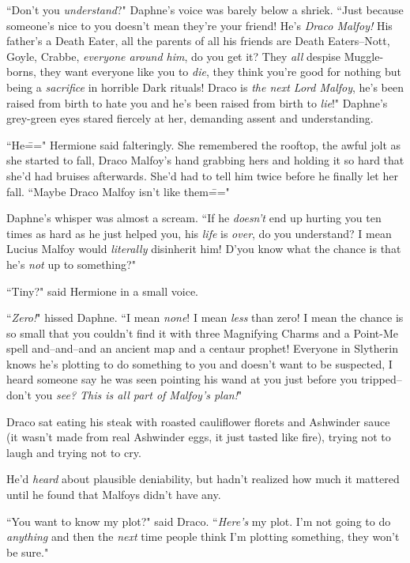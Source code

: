 ``Don't you \emph{understand}?" Daphne's voice was barely below a shriek. ``Just because someone's nice to you doesn't mean they're your friend! He's \emph{Draco Malfoy!} His father's a Death Eater, all the parents of all his friends are Death Eaters\---Nott, Goyle, Crabbe, \emph{everyone around him}, do you get it? They \emph{all} despise Muggle-borns, they want everyone like you to \emph{die}, they think you're good for nothing but being a \emph{sacrifice} in horrible Dark rituals! Draco is \emph{the next Lord Malfoy}, he's been raised from birth to hate you and he's been raised from birth to \emph{lie}!" Daphne's grey-green eyes stared fiercely at her, demanding assent and understanding.

``He\===" Hermione said falteringly. She remembered the rooftop, the awful jolt as she started to fall, Draco Malfoy's hand grabbing hers and holding it so hard that she'd had bruises afterwards. She'd had to tell him twice before he finally let her fall. ``Maybe Draco Malfoy isn't like them\==="

Daphne's whisper was almost a scream. ``If he \emph{doesn't} end up hurting you ten times as hard as he just helped you, his \emph{life} is \emph{over}, do you understand? I mean Lucius Malfoy would \emph{literally} disinherit him! D'you know what the chance is that he's \emph{not} up to something?"

``Tiny?" said Hermione in a small voice.

``\emph{Zero!}" hissed Daphne. ``I mean \emph{none}! I mean \emph{less} than zero! I mean the chance is so small that you couldn't find it with three Magnifying Charms and a Point-Me spell and\---and\---and an ancient map and a centaur prophet! Everyone in Slytherin knows he's plotting to do something to you and doesn't want to be suspected, I heard someone say he was seen pointing his wand at you just before you tripped\---don't you \emph{see? This is all part of Malfoy's plan!}"

\later

Draco sat eating his steak with roasted cauliflower florets and Ashwinder sauce (it wasn't made from real Ashwinder eggs, it just tasted like fire), trying not to laugh and trying not to cry.

He'd \emph{heard} about plausible deniability, but hadn't realized how much it mattered until he found that Malfoys didn't have any.

``You want to know my plot?" said Draco. ``\emph{Here's} my plot. I'm not going to do \emph{anything} and then the \emph{next} time people think I'm plotting something, they won't be sure."

